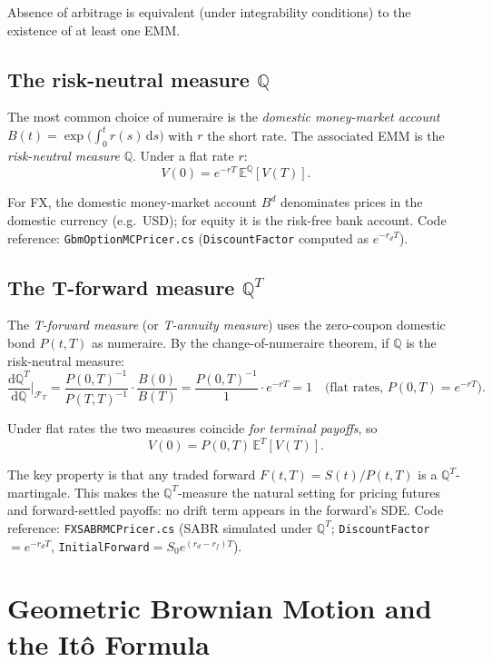 \documentclass[11pt,a4paper]{article}
\newcommand{\dd}{\mathrm{d}}
\newcommand{\E}{\mathbb{E}}
\newcommand{\Q}{\mathbb{Q}}
\newcommand{\QT}{\mathbb{Q}^T}
\newcommand{\F}{\mathcal{F}}
\newcommand{\coderef}[1]{\texttt{\color{blue!60!black}#1}}
\theoremstyle{definition}
\begin{document}
Absence of arbitrage is equivalent (under integrability conditions) to the
existence of at least one EMM.

\subsection{The risk-neutral measure $\Q$}

The most common choice of numeraire is the \emph{domestic money-market account}
$B(t)=\exp\!\bigl(\int_0^t r(s)\,\dd s\bigr)$ with $r$ the short rate.  The
associated EMM is the \emph{risk-neutral measure} $\Q$.  Under a flat rate $r$:
\[
  V(0) = e^{-rT}\,\E^\Q[V(T)].
\]

For FX, the domestic money-market account $B^d$ denominates prices in the
domestic currency (e.g.\ USD); for equity it is the risk-free bank account.
Code reference: \coderef{GbmOptionMCPricer.cs} (\texttt{DiscountFactor}
computed as $e^{-r_d T}$).

\subsection{The T-forward measure $\QT$}

The \emph{T-forward measure} (or \emph{T-annuity measure}) uses the zero-coupon
domestic bond $P(t,T)$ as numeraire.  By the change-of-numeraire theorem, if
$\Q$ is the risk-neutral measure:
\[
  \frac{\dd\QT}{\dd\Q}\bigg|_{\F_T}
  = \frac{P(0,T)^{-1}}{P(T,T)^{-1}}\cdot\frac{B(0)}{B(T)}
  = \frac{P(0,T)^{-1}}{1}\cdot e^{-rT}
  = 1 \quad\text{(flat rates, }P(0,T)=e^{-rT}\text{)}.
\]

Under flat rates the two measures coincide \emph{for terminal payoffs}, so
\[
  V(0) = P(0,T)\,\E^T[V(T)].
\]

The key property is that any traded forward $F(t,T)=S(t)/P(t,T)$ is a
$\QT$-martingale.  This makes the $\QT$-measure the natural setting for
pricing futures and forward-settled payoffs: no drift term appears in the
forward's SDE.  Code reference: \coderef{FXSABRMCPricer.cs} (SABR simulated
under $\QT$; \texttt{DiscountFactor}$=e^{-r_d T}$,
\texttt{InitialForward}$=S_0 e^{(r_d-r_f)T}$).

\section{Geometric Brownian Motion and the It\^{o} Formula}
\label{sec:gbm}
\end{document}
